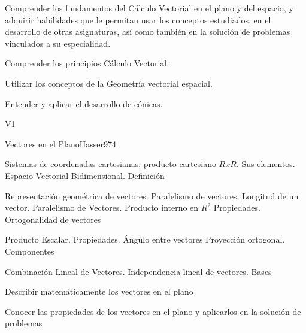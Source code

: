 \begin{syllabus}


\begin{justification}
Comprender los fundamentos del Cálculo Vectorial en el plano y del espacio, y adquirir habilidades que le permitan usar los conceptos estudiados, en el desarrollo de otras asignaturas, así como también en la solución de problemas vinculados a su especialidad.
\end{justification}

\begin{goals}
\item Comprender los principios Cálculo Vectorial.
\item Utilizar los conceptos de la Geometría vectorial espacial.
\item Entender y aplicar el desarrollo de cónicas.
\end{goals}

\begin{outcomes}{V1}
\end{outcomes}

\begin{unit}{Vectores en el Plano}{Hasser97}{4}
   \begin{topics}
      \item Sistemas de coordenadas cartesianas; producto cartesiano $RxR$. Sus elementos. Espacio Vectorial Bidimensional. Definición
      \item Representación geométrica de vectores. Paralelismo de vectores. Longitud de un  vector. Paralelismo de Vectores. Producto interno en $R^2$ Propiedades. Ortogonalidad de vectores
      \item Producto Escalar. Propiedades. Ángulo entre vectores Proyección ortogonal. Componentes
      \item Combinación Lineal de Vectores. Independencia lineal de vectores. Bases
   \end{topics}

   \begin{learningoutcomes}
      \item Describir matemáticamente los vectores en el plano
      \item Conocer las propiedades de los vectores en el plano y aplicarlos en la solución de problemas
   \end{learningoutcomes}
\end{unit}


\end{syllabus}
